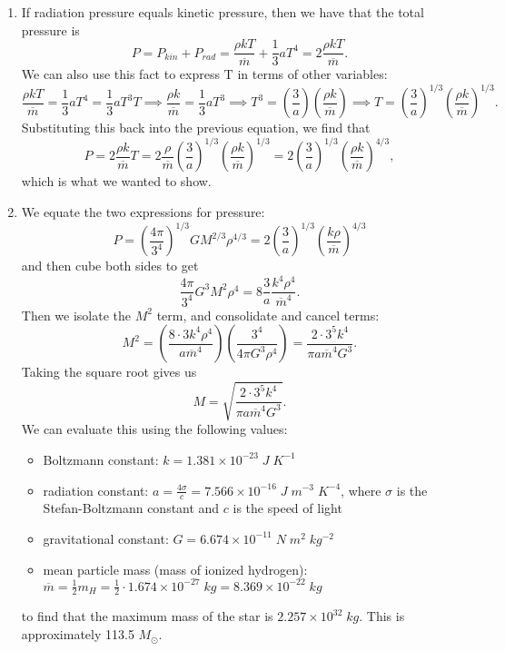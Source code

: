 \documentclass[11pt,letterpaper]{article}
\begin{document}
\begin{enumerate}[label=(\alph*)]
    
    \item
    If radiation pressure equals kinetic pressure, then we have that the total pressure is
    $$P = P_{kin} + P_{rad} = \frac{\rho kT}{\overline{m}} + \frac{1}{3}aT^4 = 2\frac{\rho kT}{\overline{m}}.$$
    We can also use this fact to express T in terms of other variables: $$\frac{\rho kT}{\overline{m}} = \frac{1}{3}aT^4 = \frac{1}{3}aT^3T \implies \frac{\rho k}{\overline{m}} = \frac{1}{3}aT^3 \implies T^3 = (\frac{3}{a})(\frac{\rho k}{\overline{m}}) \implies T = (\frac{3}{a})^{1/3}(\frac{\rho k}{\overline{m}})^{1/3}.$$ Substituting this back into the previous equation, we find that $$P = 2\frac{\rho k}{\overline{m}}T = 2\frac{\rho}{\overline{m}}(\frac{3}{a})^{1/3}(\frac{\rho k}{\overline{m}})^{1/3} = 2(\frac{3}{a})^{1/3}(\frac{\rho k}{\overline{m}})^{4/3},$$ which is what we wanted to show.
    
    
    \item
    We equate the two expressions for pressure: 
    $$P = (\frac{4\pi}{3^4})^{1/3}GM^{2/3}\rho^{4/3} = 2(\frac{3}{a})^{1/3}(\frac{k\rho}{\overline{m}})^{4/3}$$ and then cube both sides to get $$\frac{4\pi}{3^4}G^3M^2\rho^4 = 8\frac{3}{a}\frac{k^4\rho^4}{\overline{m}^4}.$$ Then we isolate the $M^2$ term, and consolidate and cancel terms: $$M^2 = (\frac{8 \cdot 3 k^4 \rho^4}{a\overline{m}^4})(\frac{3^4}{4\pi G^3\rho^4}) = \frac{2\cdot 3^5 k^4}{\pi a \overline{m}^4 G^3}.$$ Taking the square root gives us $$M = \sqrt{\frac{2\cdot 3^5 k^4}{\pi a \overline{m}^4 G^3}}.$$ We can evaluate this using the following values:
    \begin{itemize}
        \item Boltzmann constant: $k = 1.381\times 10^{-23}\;\si{J\;K^{-1}}$
        \item radiation constant: $a = \frac{4\sigma}{c} = 7.566\times 10^{-16}\;\si{J\;m^{-3}\;K^{-4}}$, where $\sigma$ is the Stefan-Boltzmann constant and $c$ is the speed of light
        \item gravitational constant: $G = 6.674 \times 10^{-11} \;\si{N\;m^2\;kg^{-2}}$
        \item mean particle mass (mass of ionized hydrogen): $\overline{m} = \frac{1}{2}m_H = \frac{1}{2} \cdot 1.674\times 10^{-27}\;\si{kg} = 8.369\times 10^{-22}\;\si{kg}$
    \end{itemize}
    to find that the maximum mass of the star is $2.257 \times 10^{32}\;\si{kg}.$ This is approximately 113.5 $M_\odot$.
    
\end{enumerate}
\end{document}
